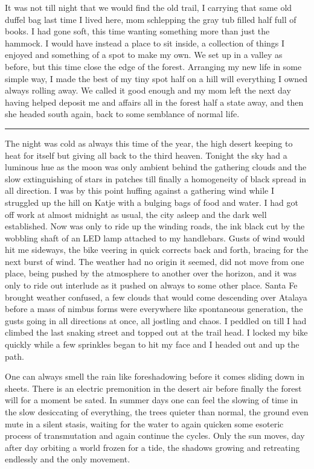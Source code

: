 \documentclass[ebook, 10pt, openright, onecolumn]{memoir}
\newcommand*\td[1]{
  \todo[inline]{
     #1 
  }
}
\newcommand*\starbreak{\fancybreak*{\Large{* * *}}}
\newcommand*\finish{\td{ ----- Finish this section -----}}
\begin{document}
It was not till night that we would find the old trail, I carrying that same old
duffel bag last time I lived here, mom schlepping the gray tub filled half full
of books.  I had gone soft, this time wanting something more than just the
hammock.  I would have instead a place to sit inside, a collection of things I
enjoyed and something of a spot to make my own.  We set up in a valley as
before, but this time close the edge of the forest.  Arranging my new life in
some simple way, I made the best of my tiny spot half on a hill will everything
I owned always rolling away.  We called it good enough and my mom left the next
day having helped deposit me and affairs all in the forest half a state away,
and then she headed south again, back to some semblance of normal life.  

\finish

\starbreak

The night was cold as always this time of the year, the high desert keeping to
heat for itself but giving all back to the third heaven.  Tonight the sky had a
luminous hue as the moon was only ambient behind the gathering clouds and the
slow extinguishing of stars in patches till finally a homogeneity of black
spread in all direction.  I was by this point huffing against a gathering wind
while I struggled up the hill on Katje with a bulging bags of food and water.  I
had got off work at almost midnight as usual, the city asleep and the dark well
established.  Now was only to ride up the winding roads, the ink black cut by
the wobbling shaft of an LED lamp attached to my handlebars.  Gusts of wind
would hit me sideways, the bike veering in quick corrects back and forth,
bracing for the next burst of wind.  The weather had no origin it seemed, did
not move from one place, being pushed by the atmosphere to another over the
horizon, and it was only to ride out interlude as it pushed on always to some
other place.  Santa Fe brought weather confused, a few clouds that would come
descending over Atalaya before a mass of nimbus forms were everywhere like
spontaneous generation, the gusts going in all directions at once, all jostling
and chaos.  I peddled on till I had climbed the last snaking street and topped
out at the trail head.  I locked my bike quickly while a few sprinkles began to
hit my face and I headed out and up the path.

One can always smell the rain like foreshadowing before it comes sliding down in
sheets.  There is an electric premonition in the desert air before finally the
forest will for a moment be sated.  In summer days one can feel the slowing of
time in the slow desiccating of everything, the trees quieter than normal, the
ground even mute in a silent stasis, waiting for the water to again quicken some
esoteric process of transmutation and again continue the cycles.  Only the sun
moves, day after day orbiting a world frozen for a tide, the shadows growing and
retreating endlessly and the only movement.
\end{document}
